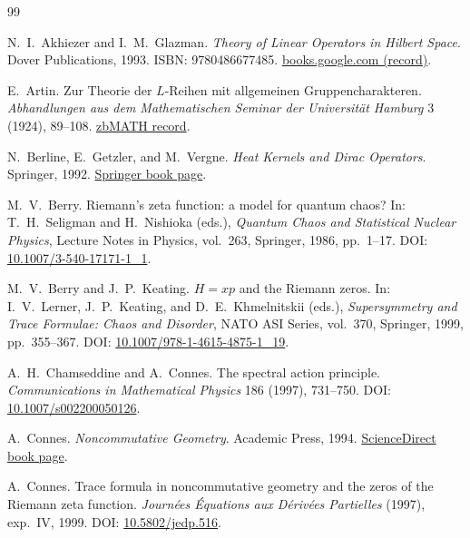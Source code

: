 \documentclass{article}
\numberwithin{equation}{section}
\theoremstyle{plain}
\theoremstyle{definition}
\theoremstyle{remark}
\begin{document}

\begin{thebibliography}{99}
\raggedright

N.~I.~Akhiezer and I.~M.~Glazman.
\newblock \emph{Theory of Linear Operators in Hilbert Space}.
\newblock Dover Publications, 1993.
\newblock ISBN: 9780486677485.
\newblock \href{https://books.google.com/books?id=9-xfAK8xOqMC}{books.google.com (record)}.

E.~Artin.
\newblock Zur Theorie der $L$-Reihen mit allgemeinen Gruppencharakteren.
\newblock \emph{Abhandlungen aus dem Mathematischen Seminar der Universit\"at Hamburg}
3 (1924), 89--108.
\newblock \href{https://zbmath.org/?q=an:50.0104.01}{zbMATH record}.


N.~Berline, E.~Getzler, and M.~Vergne.
\newblock \emph{Heat Kernels and Dirac Operators}.
\newblock Springer, 1992.
\newblock \href{https://link.springer.com/book/10.1007/978-3-540-45923-4}{Springer book page}.

M.~V.~Berry.
\newblock Riemann's zeta function: a model for quantum chaos?
\newblock In: T.~H.~Seligman and H.~Nishioka (eds.),
\newblock \emph{Quantum Chaos and Statistical Nuclear Physics},
\newblock Lecture Notes in Physics, vol.~263, Springer, 1986, pp.~1--17.
\newblock DOI:
\href{https://doi.org/10.1007/3-540-17171-1_1}{10.1007/3-540-17171-1\_1}.

M.~V.~Berry and J.~P.~Keating.
\newblock $H=xp$ and the Riemann zeros.
\newblock In: I.~V.~Lerner, J.~P.~Keating, and D.~E.~Khmelnitskii (eds.),
\newblock \emph{Supersymmetry and Trace Formulae: Chaos and Disorder},
\newblock NATO ASI Series, vol.~370, Springer, 1999, pp.~355--367.
\newblock DOI:
\href{https://doi.org/10.1007/978-1-4615-4875-1_19}{10.1007/978-1-4615-4875-1\_19}.

A.~H.~Chamseddine and A.~Connes.
\newblock The spectral action principle.
\newblock \emph{Communications in Mathematical Physics} 186 (1997), 731--750.
\newblock DOI: \href{https://doi.org/10.1007/s002200050126}{10.1007/s002200050126}.


A.~Connes.
\newblock \emph{Noncommutative Geometry}.
\newblock Academic Press, 1994.
\newblock \href{https://www.sciencedirect.com/book/9780121858605/noncommutative-geometry}{ScienceDirect book page}.

A.~Connes.
\newblock Trace formula in noncommutative geometry and the zeros of the Riemann zeta function.
\newblock \emph{Journ\'ees \'Equations aux D\'eriv\'ees Partielles} (1997), exp.~IV, 1999.
\newblock DOI:
\href{https://doi.org/10.5802/jedp.516}{10.5802/jedp.516}.


\end{thebibliography}
\end{document}
